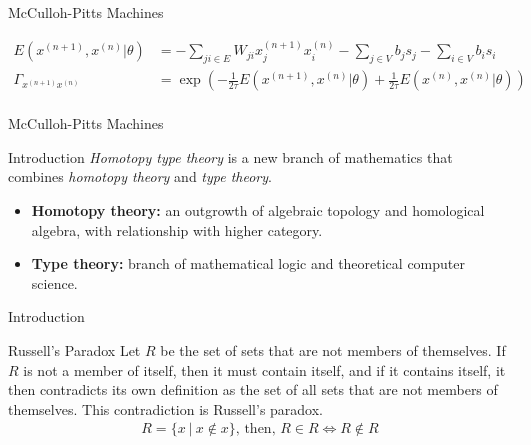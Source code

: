 \documentclass[10pt]{beamer}
\begin{document}
\begin{frame}{McCulloh-Pitts Machines}

\begin{align*}
E(x^{(n+1)},x^{(n)}|\theta) &= -\sum_{ji \in E}W_{ji}x^{(n+1)}_jx^{(n)}_i- \sum_{j \in V}b_j s_j- \sum_{i \in V}b_i s_i\\
\Gamma_{x^{(n+1)}x^{(n)}} &=\exp\left(-\frac{1}{2\tau}E(x^{(n+1)},x^{(n)}|\theta)+\frac{1}{2\tau}E(x^{(n)},x^{(n)}|\theta)\right)\\
\end{align*}
\end{frame}

\begin{frame}{McCulloh-Pitts Machines}

\end{frame}



\begin{frame}{Introduction}
\emph{Homotopy type theory} is a new branch of mathematics that combines \emph{homotopy theory} and \emph{type theory}. 
\begin{itemize}
\item \textbf{Homotopy theory:} an outgrowth of algebraic topology and homological algebra, with relationship with higher category.
\item \textbf{Type theory:} branch of mathematical logic and theoretical computer science.
\end{itemize}
\end{frame}


\begin{frame}{Introduction}
\begin{alertblock}{Russell's Paradox}
Let $R$ be the set of sets that are not members of themselves. If $R$ is not a member of itself, then it must contain itself, and if it contains itself, it then contradicts its own definition as the set of all sets that are not members of themselves. This contradiction is Russell's paradox.
\begin{align*}
R = \{x ~|~ x \notin x\}  \text{, then, } R \in R \Leftrightarrow R \notin R
\end{align*}
\end{alertblock}
\end{frame}
\end{document}
